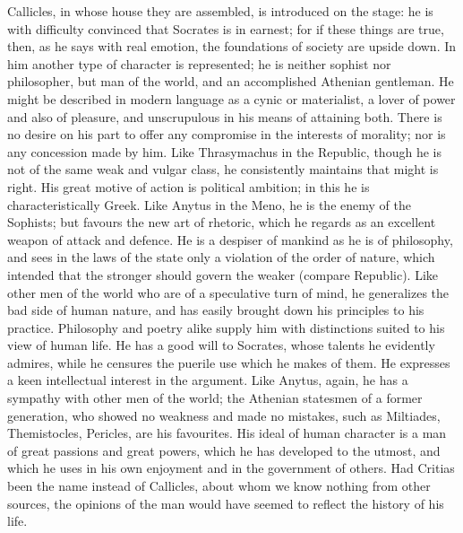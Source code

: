 \documentclass[11pt,letter]{article}
\begin{document}
\par  Callicles, in whose house they are assembled, is introduced on the stage: he is with difficulty convinced that Socrates is in earnest; for if these things are true, then, as he says with real emotion, the foundations of society are upside down. In him another type of character is represented; he is neither sophist nor philosopher, but man of the world, and an accomplished Athenian gentleman. He might be described in modern language as a cynic or materialist, a lover of power and also of pleasure, and unscrupulous in his means of attaining both. There is no desire on his part to offer any compromise in the interests of morality; nor is any concession made by him. Like Thrasymachus in the Republic, though he is not of the same weak and vulgar class, he consistently maintains that might is right. His great motive of action is political ambition; in this he is characteristically Greek. Like Anytus in the Meno, he is the enemy of the Sophists; but favours the new art of rhetoric, which he regards as an excellent weapon of attack and defence. He is a despiser of mankind as he is of philosophy, and sees in the laws of the state only a violation of the order of nature, which intended that the stronger should govern the weaker (compare Republic). Like other men of the world who are of a speculative turn of mind, he generalizes the bad side of human nature, and has easily brought down his principles to his practice. Philosophy and poetry alike supply him with distinctions suited to his view of human life. He has a good will to Socrates, whose talents he evidently admires, while he censures the puerile use which he makes of them. He expresses a keen intellectual interest in the argument. Like Anytus, again, he has a sympathy with other men of the world; the Athenian statesmen of a former generation, who showed no weakness and made no mistakes, such as Miltiades, Themistocles, Pericles, are his favourites. His ideal of human character is a man of great passions and great powers, which he has developed to the utmost, and which he uses in his own enjoyment and in the government of others. Had Critias been the name instead of Callicles, about whom we know nothing from other sources, the opinions of the man would have seemed to reflect the history of his life.
\end{document}
